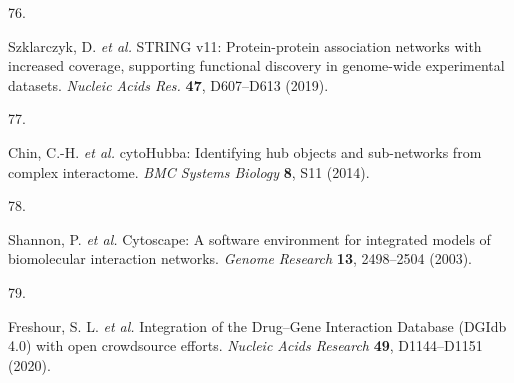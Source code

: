 \documentclass[
  11,
  a4paper,
]{article}
\newlength{\cslhangindent}
\newlength{\csllabelwidth}
\newlength{\cslentryspacingunit} %
\newenvironment{CSLReferences}[2] %
 {%
  \setlength{\parindent}{0pt}
  \ifodd #1
  \let\oldpar\par
  \def\par{\hangindent=\cslhangindent\oldpar}
  \fi
  \setlength{\parskip}{#2\cslentryspacingunit}
 }%
 {}
\newcommand{\CSLLeftMargin}[1]{\parbox[t]{\csllabelwidth}{#1}}
\newcommand{\CSLRightInline}[1]{\parbox[t]{\linewidth - \csllabelwidth}{#1}\break}
\begin{document}
\begin{CSLReferences}{0}{0}
\leavevmode{}%
\CSLLeftMargin{76. }%
\CSLRightInline{Szklarczyk, D. \emph{et al.} {STRING} v11:
Protein-protein association networks with increased coverage, supporting
functional discovery in genome-wide experimental datasets. \emph{Nucleic
Acids Res.} \textbf{47}, D607--D613 (2019).}

\leavevmode{}%
\CSLLeftMargin{77. }%
\CSLRightInline{Chin, C.-H. \emph{et al.} {cytoHubba}: Identifying hub
objects and sub-networks from complex interactome. \emph{BMC Systems
Biology} \textbf{8}, S11 (2014).}

\leavevmode{}%
\CSLLeftMargin{78. }%
\CSLRightInline{Shannon, P. \emph{et al.} Cytoscape: A software
environment for integrated models of biomolecular interaction networks.
\emph{Genome Research} \textbf{13}, 2498--2504 (2003).}

\leavevmode{}%
\CSLLeftMargin{79. }%
\CSLRightInline{Freshour, S. L. \emph{et al.} {Integration of the
Drug--Gene Interaction Database (DGIdb 4.0) with open crowdsource
efforts}. \emph{Nucleic Acids Research} \textbf{49}, D1144--D1151
(2020).}

\end{CSLReferences}
\end{document}
